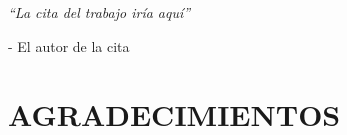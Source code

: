 \documentclass[a4paper, 11pt, spanish, twoside]{article}
\newcommand\blankpage{%
    \null
    \thispagestyle{empty}%
    \newpage}
\begin{document}
 




\newpage
\thispagestyle{empty}







 
\newpage
\thispagestyle{empty}

\begin{flushright} %
\vspace*{5cm} %

\textit{“La cita del trabajo iría aquí”} 

\medskip %
- El autor de la cita 

\end{flushright}

\afterpage{\blankpage} %




\newpage
\thispagestyle{plain}

\section*{AGRADECIMIENTOS} %
\end{document}
